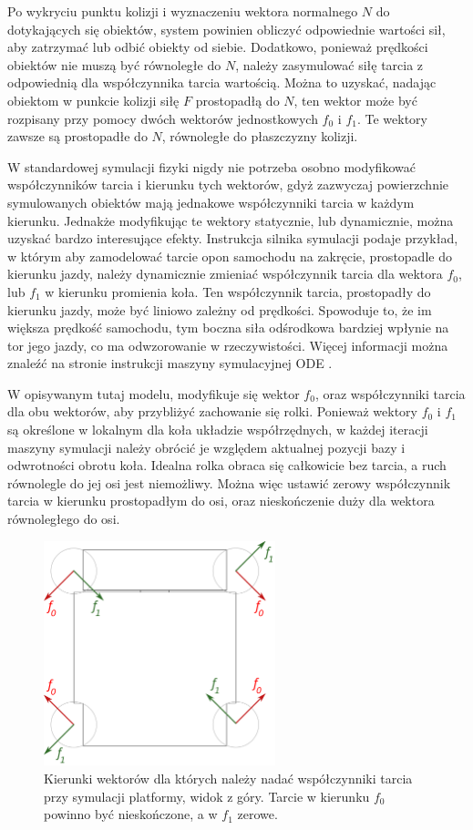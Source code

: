 		Po wykryciu punktu kolizji i wyznaczeniu wektora normalnego $N$ do dotykających się obiektów, system powinien obliczyć odpowiednie wartości sił, 
		aby zatrzymać lub odbić obiekty od siebie.
		Dodatkowo, ponieważ prędkości obiektów nie muszą być równoległe do $N$, należy zasymulować siłę tarcia z odpowiednią dla współczynnika tarcia wartością.
		Można to uzyskać, nadając obiektom w punkcie kolizji siłę $F$ prostopadłą do $N$, 
		ten wektor może być rozpisany przy pomocy dwóch wektorów jednostkowych $f_0$ i $f_1$. 
		Te wektory zawsze są prostopadłe do $N$, równoległe do płaszczyzny kolizji.

		W standardowej symulacji fizyki nigdy nie potrzeba osobno modyfikować współczynników tarcia i kierunku tych wektorów, 
		gdyż zazwyczaj powierzchnie symulowanych obiektów mają jednakowe współczynniki tarcia w każdym kierunku.
		Jednakże modyfikując te wektory statycznie, lub dynamicznie, można uzyskać bardzo interesujące efekty.
		Instrukcja silnika symulacji podaje przykład, w którym aby zamodelować tarcie opon samochodu na zakręcie, prostopadle do kierunku jazdy, 
		należy dynamicznie zmieniać współczynnik tarcia dla wektora $f_0$, lub $f_1$ w kierunku promienia koła.
		Ten współczynnik tarcia, prostopadły do kierunku jazdy, może być liniowo zależny od prędkości.
		Spowoduje to, że im większa prędkość samochodu, tym boczna siła odśrodkowa bardziej wpłynie na tor jego jazdy, co ma odwzorowanie w rzeczywistości.
		Więcej informacji można znaleźć na stronie instrukcji maszyny symulacyjnej ODE \cite{ode_contact}.

		W opisywanym tutaj modelu, modyfikuje się wektor $f_0$, oraz współczynniki tarcia dla obu wektorów, aby przybliżyć zachowanie się rolki.
		Ponieważ wektory $f_0$ i $f_1$ są określone w lokalnym dla koła układzie współrzędnych, 
		w każdej iteracji maszyny symulacji należy obrócić je względem aktualnej pozycji bazy i odwrotności obrotu koła.
		Idealna rolka obraca się całkowicie bez tarcia, a ruch równolegle do jej osi jest niemożliwy.
		Można więc ustawić zerowy współczynnik tarcia w kierunku prostopadłym do osi, oraz nieskończenie duży dla wektora równoległego do osi.

		\begin{figure}[h]
		\centering
		\includegraphics[width=0.6\textwidth]{graphics/base_vects.pdf}
		\caption{Kierunki wektorów dla których należy nadać współczynniki tarcia przy symulacji platformy, widok z góry. Tarcie w kierunku $f_0$ powinno być nieskończone, a w $f_1$ zerowe.}
		\end{figure} 


